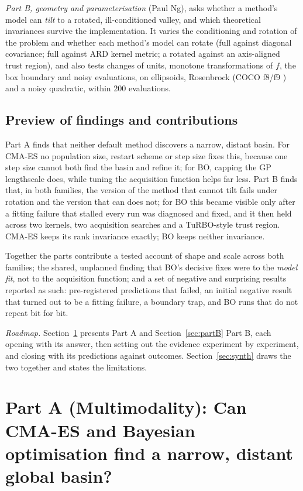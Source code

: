 \documentclass[10pt,a4paper]{article}
\begin{document}
\emph{Part B, geometry and parameterisation} (Paul Ng), asks whether a method's model can \emph{tilt} to a
rotated, ill-conditioned valley, and which theoretical invariances survive the implementation. It varies the
conditioning and rotation of the problem and whether each method's model can rotate (full against diagonal
covariance; full against ARD kernel metric; a rotated against an axis-aligned trust region), and also tests
changes of units, monotone transformations of $f$, the box boundary and noisy evaluations, on ellipsoids,
Rosenbrock (COCO f8/f9 \citep{hansen2009bbobfunctions}) and a noisy quadratic, within 200 evaluations.

\subsection{Preview of findings and contributions}
Part A finds that neither default method discovers a narrow, distant basin. For CMA-ES no population size,
restart scheme or step size fixes this, because one step size cannot both find the basin and refine it; for BO,
capping the GP lengthscale does, while tuning the acquisition function helps far less. Part B finds that, in both
families, the version of the method that cannot tilt fails under rotation and the version that can does not; for
BO this became visible only after a fitting failure that stalled every run was diagnosed and fixed, and it then
held across two kernels, two acquisition searches and a TuRBO-style trust region. CMA-ES keeps its rank invariance
exactly; BO keeps neither invariance.

Together the parts contribute a tested account of shape and scale across both families; the shared, unplanned
finding that BO's decisive fixes were to the \emph{model fit}, not to the acquisition function; and a set of
negative and surprising results reported as such: pre-registered predictions that failed, an initial negative
result that turned out to be a fitting failure, a boundary trap, and BO runs that do not repeat bit for bit.

\emph{Roadmap.} Section~\ref{sec:partA} presents Part A and Section~\ref{sec:partB} Part B, each opening with its
answer, then setting out the evidence experiment by experiment, and closing with its predictions against outcomes. Section~\ref{sec:synth} draws the two together and states the limitations.

\section{Part A (Multimodality): Can CMA-ES and Bayesian optimisation find a narrow, distant global basin?}\label{sec:partA}
\end{document}
